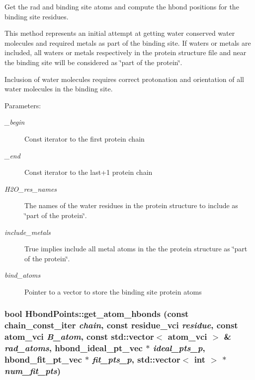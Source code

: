 Get the rad and binding site atoms and compute the hbond positions for the binding site residues.

This method represents an initial attempt at getting water conserved water molecules and required metals as part of the binding site. If waters or metals are included, all waters or metals respectively in the protein structure file and near the binding site will be considered as \char`\"{}part of the protein\char`\"{}.

Inclusion of water molecules requires correct protonation and orientation of all water molecules in the binding site.

\begin{Desc}
\item[Parameters:]
\begin{description}
\item[{\em \_\-begin}]Const iterator to the first protein chain \item[{\em \_\-end}]Const iterator to the last+1 protein chain \item[{\em H2O\_\-res\_\-names}]The names of the water residues in the protein structure to include as \char`\"{}part of the protein\char`\"{}. \item[{\em include\_\-metals}]True implies include all metal atoms in the the protein structure as \char`\"{}part of the protein\char`\"{}. \item[{\em bind\_\-atoms}]Pointer to a vector to store the binding site protein atoms \end{description}
\end{Desc}
\subsubsection{\setlength{\rightskip}{0pt plus 5cm}bool Hbond\-Points::get\_\-atom\_\-hbonds (const chain\_\-const\_\-iter {\em chain}, const residue\_\-vci {\em residue}, const atom\_\-vci {\em B\_\-atom}, const std::vector$<$ atom\_\-vci $>$ \& {\em rad\_\-atoms}, \bf{hbond\_\-ideal\_\-pt\_\-vec} $\ast$ {\em ideal\_\-pts\_\-p}, \bf{hbond\_\-fit\_\-pt\_\-vec} $\ast$ {\em fit\_\-pts\_\-p}, std::vector$<$ int $>$ $\ast$ {\em num\_\-fit\_\-pts})\hspace{0.3cm}{\tt  [private]}}\label{classASCbase_1_1HbondPoints_097c5b40240e8c09fe3bbb18fde8f373}


